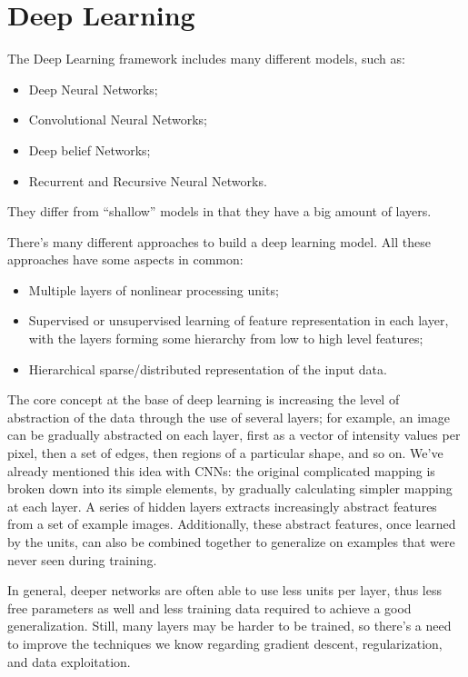 \section{Deep Learning}

The Deep Learning framework includes many different models, such as:
\begin{itemize}
    \item Deep Neural Networks;
    \item Convolutional Neural Networks;
    \item Deep belief Networks;
    \item Recurrent and Recursive Neural Networks.
\end{itemize}
They differ from ``shallow'' models in that they have a big amount of layers.

There's many different approaches to build a deep learning model. All these approaches have some aspects in common:
\begin{itemize}
    \item Multiple layers of nonlinear processing units;
    \item Supervised or unsupervised learning of feature representation in each layer, with the layers forming some hierarchy from low to high level features;
    \item Hierarchical sparse/distributed representation of the input data.
\end{itemize}

The core concept at the base of deep learning is increasing the level of abstraction of the data through the use of several layers; for example, an image can be gradually abstracted on each layer, first as a vector of intensity values per pixel, then a set of edges, then regions of a particular shape, and so on. We've already mentioned this idea with CNNs: the original complicated mapping is broken down into its simple elements, by gradually calculating simpler mapping at each layer. A series of hidden layers extracts increasingly abstract features from a set of example images. Additionally, these abstract features, once learned by the units, can also be combined together to generalize on examples that were never seen during training.

In general, deeper networks are often able to use less units per layer, thus less free parameters as well and less training data required to achieve a good generalization. Still, many layers may be harder to be trained, so there's a need to improve the techniques we know regarding gradient descent, regularization, and data exploitation.

